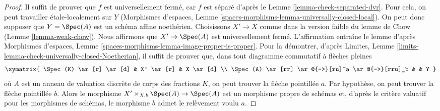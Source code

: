 \begin{proof}
Il suffit de prouver que $f$ est universellement fermé, car $f$ est séparé d'après le
Lemme \ref{lemma-check-separated-dvr}.
Pour cela, on peut travailler \'etale-localement sur $Y$
(Morphismes d'espaces, Lemme
\ref{spaces-morphisms-lemma-universally-closed-local}).
On peut donc supposer que $Y = \Spec(A)$ est un schéma affine noethérien.
Choisissons $X' \to X$ comme dans la version faible du lemme de Chow
(Lemme \ref{lemma-weak-chow}). Nous affirmons que $X' \to \Spec(A)$
est universellement fermé. L'affirmation entraîne le lemme d'après
Morphismes d'espaces, Lemme \ref{spaces-morphisms-lemma-image-proper-is-proper}.
Pour la démontrer, d'après
Limites, Lemme \ref{limits-lemma-check-universally-closed-Noetherian},
il suffit de prouver que, dans tout diagramme commutatif à flèches pleines
$$
\xymatrix{
\Spec(K) \ar[r] \ar[d] & X' \ar[r] & X \ar[d] \\
\Spec(A) \ar[rr] \ar@{-->}[ru]^a \ar@{-->}[rru]_b & & Y
}
$$
où $A$ est un anneau de valuation discrète de corps des fractions $K$, on peut trouver la
flèche pointillée $a$. Par hypothèse, on peut trouver la flèche pointillée $b$.
Alors le morphisme $X' \times_{X, b} \Spec(A) \to \Spec(A)$
est un morphisme propre de schémas et, d'après le critère valuatif
pour les morphismes de schémas, le morphisme $b$ admet le relèvement voulu $a$.
\end{proof}

